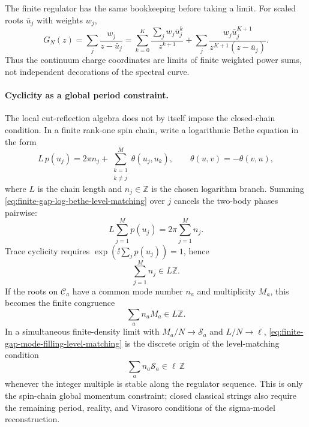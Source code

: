 The finite regulator has the same bookkeeping before taking a limit.  For
scaled roots \(\bar u_j\) with weights \(w_j\),
\[
  G_N(z)=\sum_j\frac{w_j}{z-\bar u_j}
  =
  \sum_{k=0}^{K}\frac{\sum_j w_j\bar u_j^k}{z^{k+1}}
  +
  \sum_j
  \frac{w_j\bar u_j^{K+1}}{z^{K+1}(z-\bar u_j)} .
\]
Thus the continuum charge coordinates are limits of finite weighted power
sums, not independent decorations of the spectral curve.

\paragraph{Cyclicity as a global period constraint.}
The local cut-reflection algebra does not by itself impose the closed-chain
condition.  In a finite rank-one spin chain, write a logarithmic Bethe
equation in the form
\begin{equation}
  L\,p(u_j)
  =
  2\pi n_j
  +
  \sum_{\substack{k=1\\k\ne j}}^M\theta(u_j,u_k),
  \qquad
  \theta(u,v)=-\theta(v,u),
  \label{eq:finite-gap-log-bethe-level-matching}
\end{equation}
where \(L\) is the chain length and \(n_j\in\mathbb Z\) is the chosen
logarithm branch.  Summing \eqref{eq:finite-gap-log-bethe-level-matching}
over \(j\) cancels the two-body phases pairwise:
\[
  L\sum_{j=1}^M p(u_j)
  =
  2\pi\sum_{j=1}^M n_j .
\]
Trace cyclicity requires \(\exp(\ii\sum_jp(u_j))=1\), hence
\[
  \sum_{j=1}^M n_j\in L\mathbb Z .
\]
If the roots on \(\mathcal C_a\) have a common mode number \(n_a\) and
multiplicity \(M_a\), this becomes the finite congruence
\begin{equation}
  \sum_a n_a M_a\in L\mathbb Z .
  \label{eq:finite-gap-mode-filling-level-matching}
\end{equation}
In a simultaneous finite-density limit with \(M_a/N\to\mathcal S_a\) and
\(L/N\to\ell\), \eqref{eq:finite-gap-mode-filling-level-matching} is the
discrete origin of the level-matching condition
\[
  \sum_a n_a\mathcal S_a\in \ell\,\mathbb Z
\]
whenever the integer multiple is stable along the regulator sequence.  This
is only the spin-chain global momentum constraint; closed classical strings
also require the remaining period, reality, and Virasoro conditions of the
sigma-model reconstruction.

